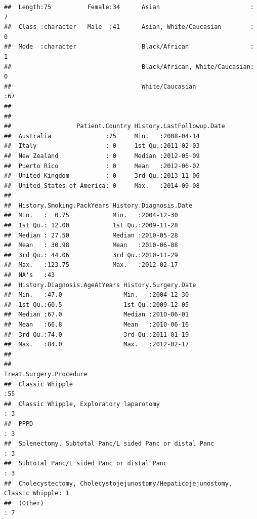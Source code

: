 \documentclass{article}\usepackage[]{graphicx}\usepackage[]{color}
\makeatletter
\newenvironment{kframe}{%
 \def\at@end@of@kframe{}%
 \ifinner\ifhmode%
  \def\at@end@of@kframe{\end{minipage}}%
  \begin{minipage}{\columnwidth}%
 \fi\fi%
 \def\FrameCommand##1{\hskip\@totalleftmargin \hskip-\fboxsep
 \colorbox{shadecolor}{##1}\hskip-\fboxsep
     \hskip-\linewidth \hskip-\@totalleftmargin \hskip\columnwidth}%
 \MakeFramed {\advance\hsize-\width
   \@totalleftmargin\z@ \linewidth\hsize
   \@setminipage}}%
 {\par\unskip\endMakeFramed%
 \at@end@of@kframe}
\newenvironment{knitrout}{}{} %
\makeatother
\begin{document}
\begin{knitrout}
\begin{kframe}
\begin{verbatim}
##  Length:75          Female:34      Asian                         : 7     
##  Class :character   Male  :41      Asian, White/Caucasian        : 0     
##  Mode  :character                  Black/African                 : 1     
##                                    Black/African, White/Caucasian: 0     
##                                    White/Caucasian               :67     
##                                                                          
##                                                                          
##                  Patient.Country History.LastFollowup.Date
##  Australia               :75     Min.   :2008-04-14       
##  Italy                   : 0     1st Qu.:2011-02-03       
##  New Zealand             : 0     Median :2012-05-09       
##  Puerto Rico             : 0     Mean   :2012-06-02       
##  United Kingdom          : 0     3rd Qu.:2013-11-06       
##  United States of America: 0     Max.   :2014-09-08       
##                                                           
##  History.Smoking.PackYears History.Diagnosis.Date
##  Min.   :  0.75            Min.   :2004-12-30    
##  1st Qu.: 12.00            1st Qu.:2009-11-28    
##  Median : 27.50            Median :2010-05-28    
##  Mean   : 30.98            Mean   :2010-06-08    
##  3rd Qu.: 44.06            3rd Qu.:2010-11-29    
##  Max.   :123.75            Max.   :2012-02-17    
##  NA's   :43                                      
##  History.Diagnosis.AgeAtYears History.Surgery.Date
##  Min.   :47.0                 Min.   :2004-12-30  
##  1st Qu.:60.5                 1st Qu.:2009-12-05  
##  Median :67.0                 Median :2010-06-01  
##  Mean   :66.8                 Mean   :2010-06-16  
##  3rd Qu.:74.0                 3rd Qu.:2011-01-19  
##  Max.   :84.0                 Max.   :2012-02-17  
##                                                   
##                                                                 Treat.Surgery.Procedure
##  Classic Whipple                                                            :55        
##  Classic Whipple, Exploratory laparotomy                                    : 3        
##  PPPD                                                                       : 3        
##  Splenectomy, Subtotal Panc/L sided Panc or distal Panc                     : 3        
##  Subtotal Panc/L sided Panc or distal Panc                                  : 3        
##  Cholecystectomy, Cholecystojejunostomy/Hepaticojejunostomy, Classic Whipple: 1        
##  (Other)                                                                    : 7        

\end{verbatim}
\end{kframe}
\end{knitrout}
\end{document}
